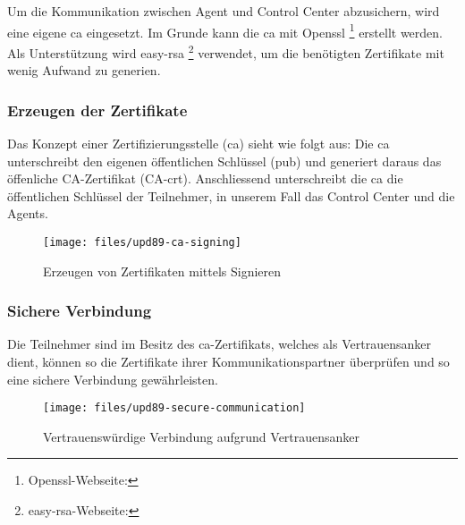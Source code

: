 Um die Kommunikation zwischen Agent und Control Center abzusichern, wird eine eigene \gls{ca} eingesetzt. Im Grunde kann die \gls{ca} mit Openssl \footnote{Openssl-Webseite: } erstellt werden. Als Unterstützung wird easy-rsa \footnote{easy-rsa-Webseite: } verwendet, um die benötigten Zertifikate mit wenig Aufwand zu generien.

\subsubsection*{Erzeugen der Zertifikate}
Das Konzept einer Zertifizierungsstelle (\gls{ca}) sieht wie folgt aus: Die \gls{ca} unterschreibt den eigenen öffentlichen Schlüssel (pub) und generiert daraus das öffenliche CA-Zertifikat (CA-crt). Anschliessend unterschreibt die \gls{ca} die öffentlichen Schlüssel der Teilnehmer, in unserem Fall das Control Center und die Agents.

\begin{figure}
  \centering
    \texttt{[image: files/upd89-ca-signing]}
  \caption{Erzeugen von Zertifikaten mittels Signieren}
  \label{fig:sec-signin}
\end{figure}

\clearpage
\subsubsection*{Sichere Verbindung}

Die Teilnehmer sind im Besitz des \gls{ca}-Zertifikats, welches als Vertrauensanker dient, können so die Zertifikate ihrer Kommunikationspartner überprüfen und so eine sichere Verbindung gewährleisten.

\begin{figure}
  \centering
    \texttt{[image: files/upd89-secure-communication]}
  \caption{Vertrauenswürdige Verbindung aufgrund Vertrauensanker}
  \label{fig:sec-connection}
\end{figure}
